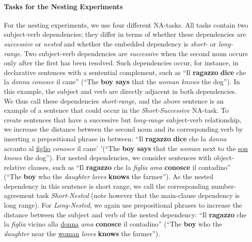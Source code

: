 \paragraph{Tasks for the Nesting Experiments} For the nesting experiments, we use four different NA-tasks. All tasks contain two subject-verb dependencies; they differ in terms of whether these dependencies are \emph{successive} or \emph{nested} and whether the embedded dependency is \emph{short-} or \emph{long-range}. Two subject-verb dependencies are \emph{successive} when the second noun occurs only after the first has been resolved. 
Such dependencies occur, for instance, in declarative sentences with a sentential complement, such as ``Il \textbf{ragazzo} \textbf{dice} che la \textit{donna conosce} il cane'' (``The \textbf{boy says} that the \emph{woman knows} the dog'').
In this example, the subject and verb are directly adjacent in both dependencies.
We thus call these dependencies \emph{short-range}, and the above sentence is an example of a sentence that could occur in the \emph{Short-Successive} NA-task. 
To create sentences that have a successive but \emph{long-range} subject-verb relationship, we increase the distance between the second noun and its corresponding verb by inserting a prepositional phrase in between: ``Il \textbf{ragazzo} \textbf{dice} che la \textit{donna} accanto al \underline{figlio} \textit{conosce} il cane' '(``The \textbf{boy says} that the \emph{woman} next to the \underline{son} \emph{knows} the dog''). For nested dependencies, we consider sentences with object-relative clauses, such as ``Il \textbf{ragazzo} che la \emph{figlia} \emph{ama} \textbf{conosce} il contadino'' (``The \textbf{boy} who the \emph{daughter} \emph{loves} \textbf{knows} the farmer'').
As the nested dependency in this sentence is short range, we call the corresponding number-agreement task \emph{Short-Nested} (note however that the main-clause dependency is long range). For \emph{Long-Nested}, we again use prepositional phrases to increase the distance between the subject and verb of the nested dependency: ``Il \textbf{ragazzo} che la \emph{figlia} vicino alla \underline{donna} \emph{ama} \textbf{conosce} il contadino'' (``The \textbf{boy} who the \emph{daughter} near the \underline{woman} \emph{loves} \textbf{knows} the farmer'').